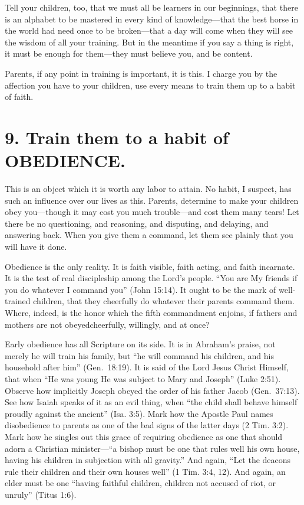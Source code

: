 \documentclass[
]{book}
\begin{document}
Tell your children, too, that we must all be learners in our beginnings, that there is an alphabet to be mastered in every kind of knowledge---that the best horse in the world had need once to be broken---that a day will come when they will see the wisdom of all your training. But in the meantime if you say a thing is right, it must be enough for them---they must believe you, and be content.

Parents, if any point in training is important, it is this. I charge you by the affection you have to your children, use every means to train them up to a habit of faith.

\hypertarget{train-them-to-a-habit-of-obedience.}{%
\section*{9. Train them to a habit of OBEDIENCE.}\label{train-them-to-a-habit-of-obedience.}}

This is an object which it is worth any labor to attain. No habit, I suspect, has such an influence over our lives as this. Parents, determine to make your children obey you---though it may cost you much trouble---and cost them many tears! Let there be no questioning, and reasoning, and disputing, and delaying, and answering back. When you give them a command, let them see plainly that you will have it done.

Obedience is the only reality. It is faith visible, faith acting, and faith incarnate. It is the test of real discipleship among the Lord's people. ``You are My friends if you do whatever I command you'' (John 15:14). It ought to be the mark of well-trained children, that they cheerfully do whatever their parents command them. Where, indeed, is the honor which the fifth commandment enjoins, if fathers and mothers are not obeyedcheerfully, willingly, and at once?

Early obedience has all Scripture on its side. It is in Abraham's praise, not merely he will train his family, but ``he will command his children, and his household after him'' (Gen.~18:19). It is said of the Lord Jesus Christ Himself, that when ``He was young He was subject to Mary and Joseph'' (Luke 2:51). Observe how implicitly Joseph obeyed the order of his father Jacob (Gen.~37:13). See how Isaiah speaks of it as an evil thing, when ``the child shall behave himself proudly against the ancient'' (Isa. 3:5). Mark how the Apostle Paul names disobedience to parents as one of the bad signs of the latter days (2 Tim. 3:2). Mark how he singles out this grace of requiring obedience as one that should adorn a Christian minister---``a bishop must be one that rules well his own house, having his children in subjection with all gravity.'' And again, ``Let the deacons rule their children and their own houses well'' (1 Tim. 3:4, 12). And again, an elder must be one ``having faithful children, children not accused of riot, or unruly'' (Titus 1:6).
\end{document}
